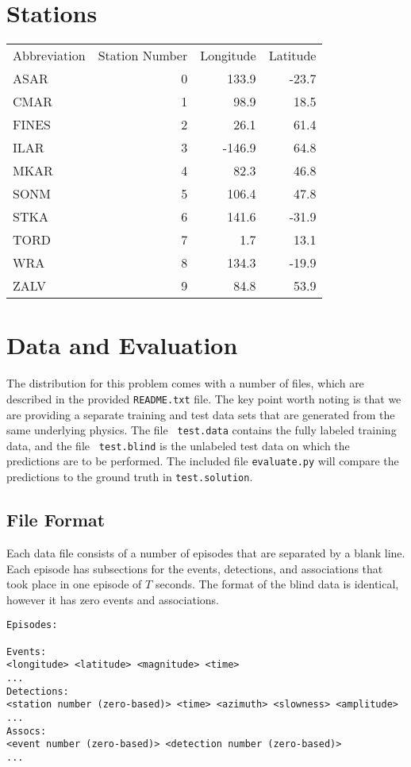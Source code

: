 \documentclass[12pt,letterpaper,onecolumn,oneside]{article}
\begin{document}
\section{Stations}

\begin{tabular}{lrrr}
Abbreviation & Station Number & Longitude & Latitude \\
ASAR & 0 & 133.9 & -23.7 \\
CMAR & 1 & 98.9 & 18.5 \\
FINES & 2 & 26.1 & 61.4 \\
ILAR & 3 & -146.9 & 64.8 \\
MKAR & 4 & 82.3 & 46.8 \\
SONM & 5 & 106.4 & 47.8 \\
STKA & 6 & 141.6 & -31.9 \\
TORD & 7 & 1.7 & 13.1 \\
WRA & 8 & 134.3 & -19.9 \\
ZALV & 9 & 84.8 & 53.9 \\ 
\end{tabular}


\section{Data and Evaluation}

The distribution for this problem comes with a number of files, which
are described in the provided {\tt README.txt} file. The key point worth
noting is that we are providing a separate training and test data sets
that are generated from the same underlying physics. The file {\tt
  test.data} contains the fully labeled training data, and the file {\tt
  test.blind} is the unlabeled test data on which the predictions are to
be performed. The included file {\tt evaluate.py} will compare the
predictions to the ground truth in {\tt test.solution}.

\subsection{File Format}

Each data file consists of a number of episodes that are separated by a
blank line. Each episode has subsections for the events, detections, and
associations that took place in one episode of $T$ seconds.
The format of the blind data is identical, however it has zero events
and associations.

\begin{verbatim}
Episodes:

Events:
<longitude> <latitude> <magnitude> <time>
...
Detections:
<station number (zero-based)> <time> <azimuth> <slowness> <amplitude>
...
Assocs:
<event number (zero-based)> <detection number (zero-based)>
...

\end{verbatim}
\end{document}
